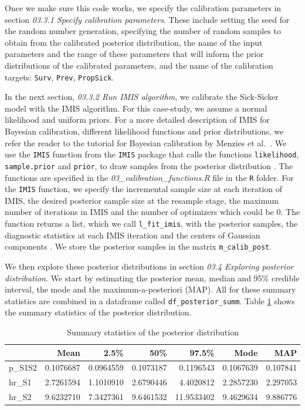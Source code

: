 \documentclass[]{book}
\begin{document}
Once we make sure this code works, we specify the calibration parameters in section \emph{03.3.1 Specify calibration parameters}. These include setting the seed for the random number generation, specifying the number of random samples to obtain from the calibrated posterior distribution, the name of the input parameters and the range of these parameters that will inform the prior distributions of the calibrated parameters, and the name of the calibration targets: \texttt{Surv}, \texttt{Prev}, \texttt{PropSick}.

In the next section, \emph{03.3.2 Run IMIS algorithm}, we calibrate the Sick-Sicker model with the IMIS algorithm. For this case-study, we assume a normal likelihood and uniform priors. For a more detailed description of IMIS for Bayesian calibration, different likelihood functions and prior distributions, we refer the reader to the tutorial for Bayesian calibration by Menzies et al.~\citep{Menzies2017}. We use the \texttt{IMIS} function from the \texttt{IMIS} package that calls the functions \texttt{likelihood}, \texttt{sample.prior} and \texttt{prior}, to draw samples from the posterior distribution \citep{IMIS}. The functions are specified in the \emph{03\_calibration\_functions.R} file in the \texttt{R} folder. For the \texttt{IMIS} function, we specify the incremental sample size at each iteration of IMIS, the desired posterior sample size at the resample stage, the maximum number of iterations in IMIS and the number of optimizers which could be 0. The function returns a list, which we call \texttt{l\_fit\_imis}, with the posterior samples, the diagnostic statistics at each IMIS iteration and the centers of Gaussian components \citep{IMIS}. We store the posterior samples in the matrix \texttt{m\_calib\_post}.

We then explore these posterior distributions in section \emph{03.4 Exploring posterior distribution}. We start by estimating the posterior mean, median and 95\% credible interval, the mode and the maximum-a-posteriori (MAP). All for these summary statistics are combined in a dataframe called \texttt{df\_posterior\_summ}. Table \ref{tab:SummaryCal} shows the summary statistics of the posterior distribution.

\begin{table}[t]

\caption{\label{tab:SummaryCal}Summary statistics of the posterior distribution}
\centering
\begin{tabular}{l|r|r|r|r|r|r}
\hline
  & Mean & 2.5\% & 50\% & 97.5\% & Mode & MAP\\
\hline
p\_S1S2 & 0.1076687 & 0.0964559 & 0.1073187 & 0.1196543 & 0.1067639 & 0.107841\\
\hline
hr\_S1 & 2.7261594 & 1.1010910 & 2.6790446 & 4.4020812 & 2.2857230 & 2.297053\\
\hline
hr\_S2 & 9.6232710 & 7.3427361 & 9.6461532 & 11.9533402 & 9.4629634 & 9.886776\\
\hline
\end{tabular}
\end{table}
\end{document}
